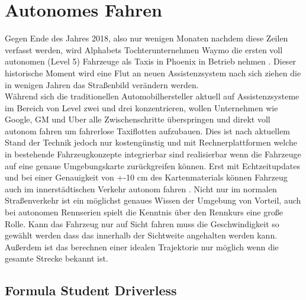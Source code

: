 \documentclass{like}
\begin{document}
  








\setcounter{page}{1}   %

\chapter{Autonomes Fahren}
Gegen Ende des Jahres 2018, also nur wenigen Monaten nachdem diese Zeilen verfasst werden, wird Alphabets Tochterunternehmen Waymo die ersten voll autonomen (Level 5) Fahrzeuge als Taxis in Phoenix in Betrieb nehmen \cite{Waymo}. Dieser historische Moment wird eine Flut an neuen Assistenzsystem nach sich ziehen die in wenigen Jahren das Straßenbild verändern werden. \\
Während sich die traditionellen Automobilhersteller aktuell auf Assistenzsysteme im Bereich von Level zwei und drei konzentrieren, wollen Unternehmen wie Google, GM und Uber alle Zwischenschritte überspringen und direkt voll autonom fahren um fahrerlose Taxiflotten aufzubauen. Dies ist nach aktuellem Stand der Technik jedoch nur kostengünstig und mit Rechnerplattformen welche in bestehende Fahrzeugkonzepte integrierbar sind realisierbar wenn die Fahrzeuge auf eine genaue Umgebungskarte zurückgreifen können. Erst mit Echtzeitupdates und bei einer Genauigkeit von +-10 cm des Kartenmaterials können Fahrzeug auch im innerstädtischen Verkehr autonom fahren \cite{SEIF2016159}. 
Nicht nur im normalen Straßenverkehr ist ein möglichst genaues Wissen der Umgebung von Vorteil, auch bei autonomen Rennserien spielt die Kenntnis über den Rennkurs eine große Rolle. Kann das Fahrzeug nur auf Sicht fahren muss die Geschwindigkeit so gewählt werden dass das innerhalb der Sichtweite angehalten werden kann. Außerdem ist das berechnen einer idealen Trajektorie nur möglich wenn die gesamte Strecke bekannt ist.


\section{Formula Student Driverless}
\end{document}
